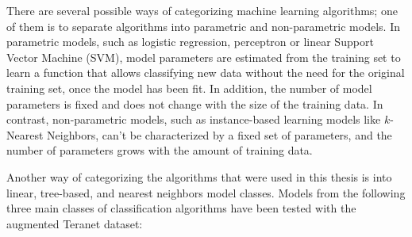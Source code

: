 There are several possible ways of categorizing machine learning algorithms;
one of them is to separate algorithms into parametric and non-parametric models.
In parametric models, such as logistic regression, perceptron or linear Support Vector Machine (SVM), model parameters are estimated from the training set to learn a function that allows classifying new data without the need for the original training set, once the model has been fit.
In addition, the number of model parameters is fixed and does not change with the size of the training data.
In contrast, non-parametric models, such as instance-based learning models like $k$-Nearest Neighbors, can't be characterized by a fixed set of parameters, and the number of parameters grows with the amount of training data.

Another way of categorizing the algorithms that were used in this thesis is into linear, tree-based, and nearest neighbors model classes.
Models from the following three main classes of classification algorithms have been tested with the augmented Teranet dataset:

